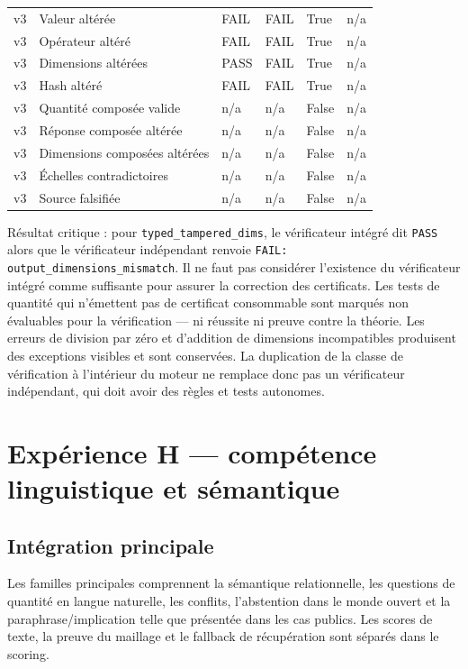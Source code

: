 \documentclass[11pt,a4paper]{article}
\begin{document}
\begin{longtable}{p{}p{}p{}p{}p{}p{}}
v3 & Valeur altérée & FAIL & FAIL & True & n/a \\
v3 & Opérateur altéré & FAIL & FAIL & True & n/a \\
v3 & Dimensions altérées & PASS & FAIL & True & n/a \\
v3 & Hash altéré & FAIL & FAIL & True & n/a \\
v3 & Quantité composée valide & n/a & n/a & False & n/a \\
v3 & Réponse composée altérée & n/a & n/a & False & n/a \\
v3 & Dimensions composées altérées & n/a & n/a & False & n/a \\
v3 & Échelles contradictoires & n/a & n/a & False & n/a \\
v3 & Source falsifiée & n/a & n/a & False & n/a \\
\bottomrule
\end{longtable}
\normalsize\setlength{\tabcolsep}{6pt}

Résultat critique : pour \texttt{typed\_tampered\_dims}, le vérificateur intégré dit \texttt{PASS} alors que le vérificateur indépendant renvoie \texttt{FAIL: output\_dimensions\_mismatch}. Il ne faut pas considérer l’existence du vérificateur intégré comme suffisante pour assurer la correction des certificats. Les tests de quantité qui n’émettent pas de certificat consommable sont marqués non évaluables pour la vérification — ni réussite ni preuve contre la théorie. Les erreurs de division par zéro et d’addition de dimensions incompatibles produisent des exceptions visibles et sont conservées. La duplication de la classe de vérification à l’intérieur du moteur ne remplace donc pas un vérificateur indépendant, qui doit avoir des règles et tests autonomes.

\section{Expérience H — compétence linguistique et sémantique}
\subsection{Intégration principale}
Les familles principales comprennent la sémantique relationnelle, les questions de quantité en langue naturelle, les conflits, l’abstention dans le monde ouvert et la paraphrase/implication telle que présentée dans les cas publics. Les scores de texte, la preuve du maillage et le fallback de récupération sont séparés dans le scoring.
\end{document}
